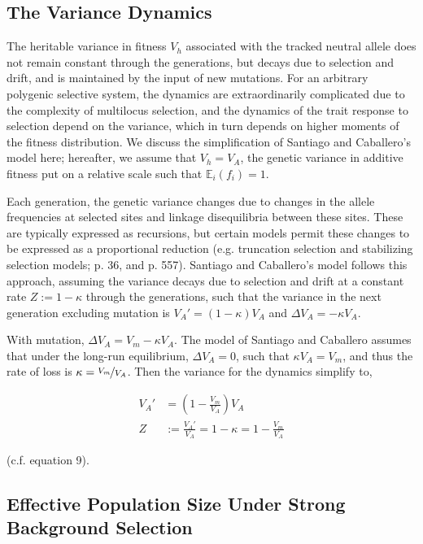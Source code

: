 \documentclass[11pt]{article}
\newcommand{\E}{\mathbb{E}}
\begin{document}
\subsection{The Variance Dynamics}

The heritable variance in fitness $V_h$ associated with the tracked neutral
allele does not remain constant through the generations, but decays due to
selection and drift, and is maintained by the input of new mutations. For an
arbitrary polygenic selective system, the dynamics are extraordinarily
complicated due to the complexity of multilocus selection, and the dynamics of
the trait response to selection depend on the variance, which in turn depends
on higher moments of the fitness distribution. We discuss the simplification of
Santiago and Caballero's model here; hereafter, we assume that $V_h = V_A$, the
genetic variance in additive fitness put on a relative scale such that
$\E_i(f_i) = 1$. 

Each generation, the genetic variance changes due to changes in the allele
frequencies at selected sites and linkage disequilibria between these sites.
These are typically expressed as recursions, but certain models permit these
changes to be expressed as a proportional reduction (e.g. truncation selection
and stabilizing selection models; \cite{Keightley1988-eq} p. 36, and
\cite{Walsh2018-bt} p. 557). Santiago and Caballero's model follows this
approach, assuming the variance decays due to selection and drift at a constant
rate $Z := 1-\kappa$ through the generations, such that the variance in the next
generation excluding mutation is $V_A' = (1-\kappa) V_A$ and $\Delta V_A =
-\kappa V_A$.

With mutation, $\Delta V_A = V_m - \kappa V_A$. The model of Santiago and
Caballero assumes that under the long-run equilibrium, $\Delta V_A = 0$, such
that $\kappa V_A = V_m$, and thus the rate of loss is $\kappa =
\nicefrac{V_m}{V_A}$. Then the variance for the dynamics simplify to,

\begin{align}
  \label{eq:Z}
  V_A' &= \left(1 - \frac{V_m}{V_A}\right) V_A \\
  Z &:= \frac{V_A'}{V_A} = 1 - \kappa = 1 - \frac{V_m}{V_A}
\end{align}

(c.f. \cite{Santiago1998-bs} equation 9). 


\subsection{Effective Population Size Under Strong Background Selection}
\end{document}
